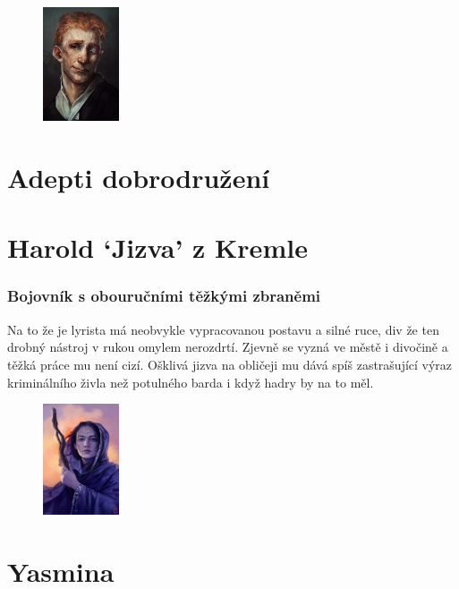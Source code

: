 \documentclass[letterpaper,onecolumn,openany,nodeprecatedcode]{dndbook}
\begin{document}
\begin{figure}
    \begin{center}
        \includegraphics[width=0.2\textwidth]{img/harold}
    \end{center}
\end{figure}

\section{Adepti dobrodružení}
\section {Harold ‘Jizva’ z Kremle}
\subsubsection{Bojovník s obouručními těžkými zbraněmi}
Na to že je lyrista má neobvykle vypracovanou postavu a silné ruce, div že ten drobný nástroj v rukou omylem nerozdrtí. Zjevně se vyzná ve městě i divočině a těžká práce mu není cizí. Ošklivá jizva na obličeji mu dává spíš zastrašující výraz kriminálního živla než potulného barda i když hadry by na to měl.
\vspace{15 mm}

\begin{figure}
    \begin{center}
        \includegraphics[width=0.2\textwidth]{img/yasmina.jpg} 
    \end{center}
\end{figure}
\section{Yasmina}
\end{document}
